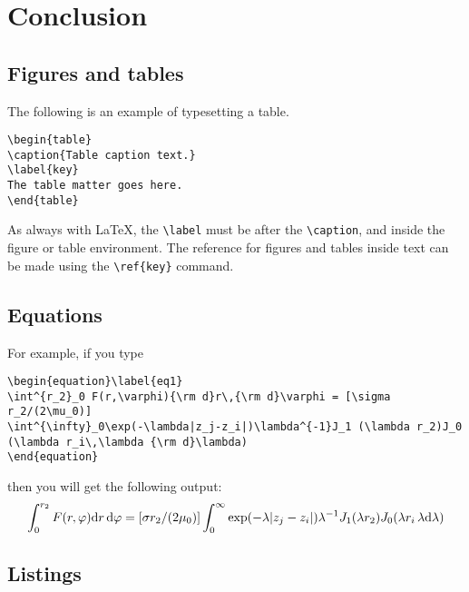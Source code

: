 \documentclass[12pt,halfline,a4paper]{ouparticle}
\begin{document}
\section{Conclusion}


\subsection{Figures and tables}
\label{sec3.9}

The following is an example of typesetting a table.

\begin{verbatim}
\begin{table}
\caption{Table caption text.}
\label{key}
The table matter goes here.
\end{table}
\end{verbatim}

As always with \LaTeX, the \verb+\label+ must be after the
\verb+\caption+, and inside the figure or table environment. The reference for
figures and tables inside text can be made using the \verb|\ref{key}| command.

\subsection{Equations}\label{sec3.10}

For example, if you type
\begin{verbatim}
\begin{equation}\label{eq1}
\int^{r_2}_0 F(r,\varphi){\rm d}r\,{\rm d}\varphi = [\sigma r_2/(2\mu_0)]
\int^{\infty}_0\exp(-\lambda|z_j-z_i|)\lambda^{-1}J_1 (\lambda r_2)J_0
(\lambda r_i\,\lambda {\rm d}\lambda)
\end{equation}
\end{verbatim}
then you will get the following output:
\begin{equation}\label{eq1}
\int^{r_2}_0 F(r,\varphi){\rm d}r\,{\rm d}\varphi = [\sigma r_2/(2\mu_0)]\int^{\infty}_0
\exp(-\lambda|z_j-z_i|)\lambda^{-1}J_1 (\lambda r_2)J_0 (\lambda r_i\,\lambda {\rm d}\lambda)
\end{equation}

\subsection{Listings}
\label{sec3.12}
\end{document}
